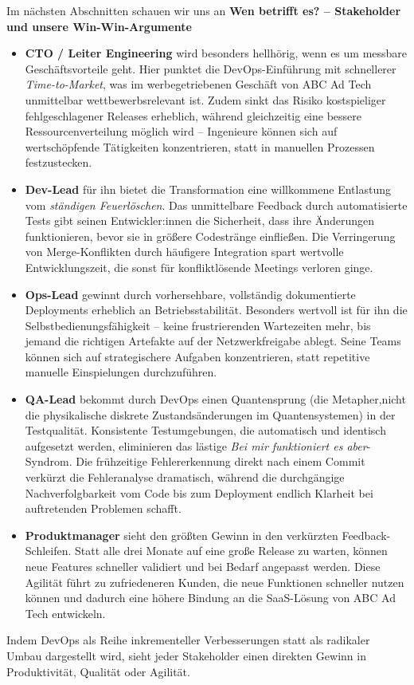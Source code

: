 Im nächsten Abschnitten schauen wir uns an \textbf{Wen betrifft es? – Stakeholder und unsere Win-Win-Argumente}
\begin{itemize}
    \item \textbf{CTO / Leiter Engineering} wird besonders hellhörig, wenn es um messbare Geschäftsvorteile geht. Hier punktet die DevOps-Einführung mit schnellerer \textit{Time-to-Market}, was im werbegetriebenen Geschäft von ABC Ad Tech unmittelbar wettbewerbsrelevant ist. Zudem sinkt das Risiko kostspieliger fehlgeschlagener Releases erheblich, während gleichzeitig eine bessere Ressourcenverteilung möglich wird – Ingenieure können sich auf wertschöpfende Tätigkeiten konzentrieren, statt in manuellen Prozessen festzustecken.
    \item \textbf{Dev-Lead} für ihn bietet die Transformation eine willkommene Entlastung vom \textit{ständigen Feuerlöschen}. Das unmittelbare Feedback durch automatisierte Tests gibt seinen Entwickler:innen die Sicherheit, dass ihre Änderungen funktionieren, bevor sie in größere Codestränge einfließen. Die Verringerung von Merge-Konflikten durch häufigere Integration spart wertvolle Entwicklungszeit, die sonst für konfliktlösende Meetings verloren ginge.
    \item \textbf{Ops-Lead} gewinnt durch vorhersehbare, vollständig dokumentierte Deployments erheblich an Betriebsstabilität. Besonders wertvoll ist für ihn die Selbstbedienungsfähigkeit – keine frustrierenden Wartezeiten mehr, bis jemand die richtigen Artefakte auf der Netzwerkfreigabe ablegt. Seine Teams können sich auf strategischere Aufgaben konzentrieren, statt repetitive manuelle Einspielungen durchzuführen.
    \item \textbf{QA-Lead} bekommt durch DevOps einen Quantensprung (die Metapher,nicht die physikalische diskrete Zustandsänderungen im Quantensystemen) in der Testqualität. Konsistente Testumgebungen, die automatisch und identisch aufgesetzt werden, eliminieren das lästige \textit{Bei mir funktioniert es aber}-Syndrom. Die frühzeitige Fehlererkennung direkt nach einem Commit verkürzt die Fehleranalyse dramatisch, während die durchgängige Nachverfolgbarkeit vom Code bis zum Deployment endlich Klarheit bei auftretenden Problemen schafft.
    \item \textbf{Produktmanager } sieht den größten Gewinn in den verkürzten Feedback-Schleifen. Statt alle drei Monate auf eine große Release zu warten, können neue Features schneller validiert und bei Bedarf angepasst werden. Diese Agilität führt zu zufriedeneren Kunden, die neue Funktionen schneller nutzen können und dadurch eine höhere Bindung an die SaaS-Lösung von ABC Ad Tech entwickeln.
\end{itemize}
Indem DevOps als Reihe inkrementeller Verbesserungen statt als radikaler Umbau dargestellt wird, sieht jeder Stakeholder einen direkten Gewinn in Produktivität, Qualität oder Agilität.
